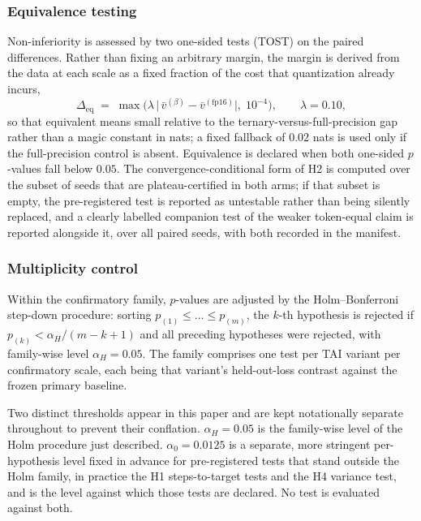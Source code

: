 \documentclass[final,5p,times,twocolumn]{elsarticle}
\theoremstyle{remark}
\begin{document}
\subsubsection{Equivalence testing}

Non-inferiority is assessed by two one-sided tests (TOST) on the paired
differences. Rather than fixing an arbitrary margin, the margin is derived from
the data at each scale as a fixed fraction of the cost that quantization already
incurs,
\begin{equation}
\label{eq:tostmargin}
\Delta_{\mathrm{eq}} \;=\;
\max\!\Big(\lambda\,\big|\,\bar{v}^{(\beta)} - \bar{v}^{(\mathrm{fp16})}\big|,\;
10^{-4}\Big),
\qquad \lambda = 0.10,
\end{equation}
so that equivalent means small relative to the ternary-versus-full-precision
gap rather than a magic constant in nats; a fixed fallback of $0.02$ nats is
used only if the full-precision control is absent. Equivalence is declared when
both one-sided $p$-values fall below $0.05$. The convergence-conditional form of
H2 is computed over the subset of seeds that are plateau-certified in
both arms; if that subset is empty, the pre-registered test is reported as
untestable rather than being silently replaced, and a clearly labelled
companion test of the weaker token-equal claim is reported alongside it, over all
paired seeds, with both recorded in the manifest.

\subsubsection{Multiplicity control}

Within the confirmatory family, $p$-values are adjusted by the Holm--Bonferroni
step-down procedure: sorting $p_{(1)} \le \dots \le p_{(m)}$, the $k$-th
hypothesis is rejected if $p_{(k)} < \alpha_{H}/(m-k+1)$ and all preceding
hypotheses were rejected, with family-wise level $\alpha_{H} = 0.05$. The
family comprises one test per TAI variant per confirmatory scale, each being
that variant's held-out-loss contrast against the frozen primary baseline.

Two distinct thresholds appear in this paper and are kept notationally separate
throughout to prevent their conflation. $\alpha_{H} = 0.05$ is the family-wise
level of the Holm procedure just described. $\alpha_{0} = 0.0125$ is a
separate, more stringent per-hypothesis level fixed in advance for
pre-registered tests that stand outside the Holm family, in practice the H1
steps-to-target tests and the H4 variance test, and is the level against which
those tests are declared. No
test is evaluated against both.
\end{document}
